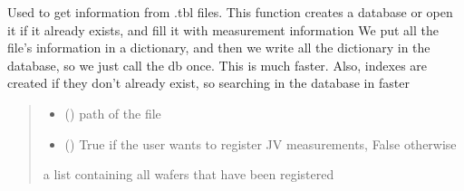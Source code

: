 \documentclass[letterpaper,10pt,english]{sphinxmanual}
\begin{document}

\begin{fulllineitems}
\label{\detokenize{new_manage_DB:new_manage_DB.create_db_tbl}}
\pysigstartsignatures
{}
\pysigstopsignatures
\sphinxAtStartPar
Used to get information from .tbl files.
This function creates a database or open it if it already exists, and fill it with measurement information
We put all the file’s information in a dictionary, and then we write all the dictionary in the database, so we just call the db once.
This is much faster.
Also, indexes are created if they don’t already exist, so searching in the database in faster
\begin{quote}\begin{description}
\begin{itemize}
\item {} 
\sphinxAtStartPar
{} () \textendash{} path of the file

\item {} 
\sphinxAtStartPar
{} () \textendash{} True if the user wants to register J\sphinxhyphen{}V measurements, False otherwise

\end{itemize}

\sphinxAtStartPar
a list containing all wafers that have been registered

\end{description}\end{quote}

\end{fulllineitems}


\begin{fulllineitems}
\label{\detokenize{new_manage_DB:new_manage_DB.setCompliance}}
\pysigstartsignatures
{}
\pysigstopsignatures
\end{fulllineitems}
\end{document}
